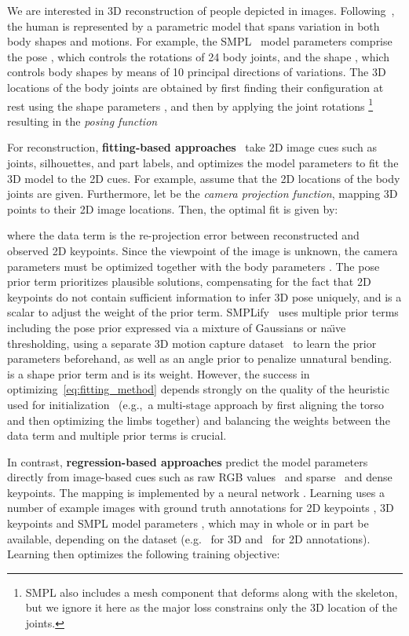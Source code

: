 \documentclass[10pt,twocolumn,letterpaper]{article}
\begin{document}
	We are interested in 3D reconstruction of people depicted in images.
	Following~\cite{anguelov2005scape,Loper2015,joo2018,pavlakos19expressive, STAR:2020}, the human is represented by a parametric model that spans variation in both body shapes and motions.
	For example, the SMPL~\cite{Loper2015} model parameters  comprise the pose , which controls the rotations of 24 body joints, and the shape , which controls body shapes by means of 10 principal directions of variations.
	The 3D locations  of the body joints are obtained by first finding their configuration at rest using the shape parameters , and then by applying the joint rotations  \footnote{SMPL also includes a mesh component that deforms along with the skeleton, but we ignore it here as the major loss constrains only the 3D location  of the joints.}
	resulting in the \emph{posing function}
	
	
	For reconstruction, \textbf{fitting-based approaches}~\cite{Bogo2016, Lassner:UP:2017} take 2D image cues such as joints, silhouettes, and part labels, and optimizes the model parameters  to fit the 3D model to the 2D cues.
	For example, assume that the 2D locations  of the body joints are given.
	Furthermore, let  be the \emph{camera projection function}, mapping 3D points to their 2D image locations.
	Then, the optimal fit is given by:
	
	where the data term  is the re-projection error between reconstructed and observed 2D keypoints.
	Since the viewpoint of the image is unknown, the camera parameters  must be optimized together with the body parameters .
The pose prior term  prioritizes plausible solutions, compensating for the fact that 2D keypoints do not contain sufficient information to infer 3D pose uniquely, and  is a scalar to adjust the weight of the prior term.
	SMPLify~\cite{Bogo2016} uses multiple prior terms including the pose prior expressed via a mixture of Gaussians or na\"{\i}ve thresholding, using a separate 3D motion capture dataset~\cite{cmu-graphics,akhter2015pose, AMASS:2019} to learn the prior parameters beforehand, as well as an angle prior to penalize unnatural bending.
	 is a shape prior term and  is its weight. 
However, the success in optimizing~\eqref{eq:fitting_method} depends strongly on the quality of the heuristic used for initialization~\cite{Bogo2016,Lassner:UP:2017} (e.g.,~a multi-stage approach by first aligning the torso and then optimizing the limbs together) and balancing the weights between the data term and multiple prior terms is crucial.
	
	In contrast, \textbf{regression-based approaches} predict the model parameters  directly from image-based cues  such as raw RGB values~\cite{kanazawa2018end} and sparse~\cite{martinez2017simple} and dense~\cite{xu2019denserac} keypoints.
	The mapping is implemented by a neural network .
	Learning uses a number of example images  with ground truth annotations for 2D keypoints , 3D keypoints  and SMPL model parameters , which may in whole or in part be available, depending on the dataset (e.g.~\cite{h36m_pami,mehta2017monocular} for 3D and~\cite{lin2014microsoft,Andriluka-14} for 2D annotations).
	Learning then optimizes the following training objective:
	
\end{document}
